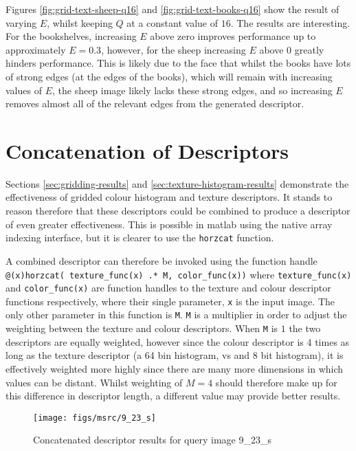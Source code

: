 Figures \ref{fig:grid-text-sheep-q16} and \ref{fig:grid-text-books-q16} show the result of varying $E$, whilst keeping $Q$ at a constant value of $16$. The results are interesting. For the bookshelves, increasing $E$ above zero improves performance up to approximately $E=0.3$, however, for the sheep increasing $E$ above $0$ greatly hinders performance. This is likely due to the face that whilst the books have lots of strong edges (at the edges of the books), which will remain with increasing values of $E$, the sheep image likely lacks these strong edges, and so increasing $E$ removes almost all of the relevant edges from the generated descriptor.

\FloatBarrier
\section{Concatenation of Descriptors} \label{sec:conc-desc-results}
Sections \ref{sec:gridding-results} and \ref{sec:texture-histogram-results} demonstrate the effectiveness of gridded colour histogram and texture descriptors. It stands to reason therefore that these descriptors could be combined to produce a descriptor of even greater effectiveness. This is possible in matlab using the native array indexing interface, but it is clearer to use the \texttt{horzcat} function.

A combined descriptor can therefore be invoked using the function handle \texttt{@(x)horzcat( texture\_func(x) .* M, color\_func(x))} where \texttt{texture\_func(x)} and \texttt{color\_func(x)} are function handles to the texture and colour descriptor functions respectively, where their single parameter, \texttt{x} is the input image. The only other parameter in this function is \texttt{M}. \texttt{M} is a multiplier in order to adjust the weighting between the texture and colour descriptors. When \texttt{M} is $1$ the two descriptors are equally weighted, however since the colour descriptor is 4 times as long as the texture descriptor (a 64 bin histogram, vs and 8 bit histogram), it is effectively weighted more highly since there are many more dimensions in which values can be distant. Whilst weighting of $M=4$ should therefore make up for this difference in descriptor length, a different value may provide better results.

\begin{figure}[ht]
	\begin{minipage}[]{0.3\linewidth}
		\centering
		\texttt{[image: figs/msrc/9\_23\_s]}
	\end{minipage}
	\begin{minipage}[]{0.7\linewidth}
		\centering
		\prplotclose
	\end{minipage}
	\caption{Concatenated descriptor results for query image 9\_23\_s}
	\label{fig:concat-sheep}
\end{figure}

